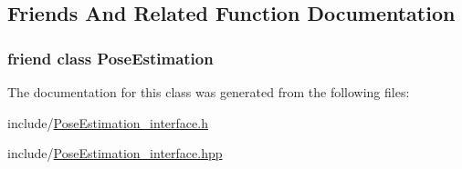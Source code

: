 \subsection{Friends And Related Function Documentation}
\hypertarget{classCandidate_acc93828d970ba58835be2e8221c7a669}{
\subsubsection[{Pose\-Estimation}]{\setlength{\rightskip}{0pt plus 5cm}friend class {\bf Pose\-Estimation}\hspace{0.3cm}{\ttfamily [friend]}}}\label{classCandidate_acc93828d970ba58835be2e8221c7a669}


The documentation for this class was generated from the following files\-:\begin{DoxyCompactItemize}
\item 
include/\hyperlink{PoseEstimation__interface_8h}{Pose\-Estimation\-\_\-interface.\-h}\item 
include/\hyperlink{PoseEstimation__interface_8hpp}{Pose\-Estimation\-\_\-interface.\-hpp}\end{DoxyCompactItemize}
